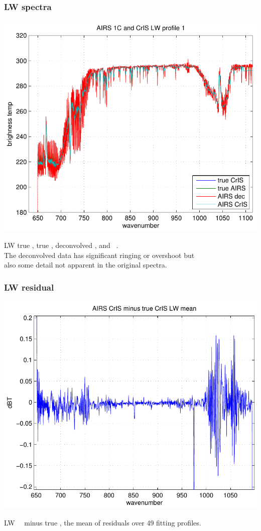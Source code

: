 \documentclass[11pt]{beamer}
\begin{document}
\begin{frame}
\frametitle{LW spectra}

\begin{center}
  \includegraphics[scale=0.54]{figures/fig_1_LW.pdf}
\end{center}

LW true \cris, true \airs, deconvolved \airs, and \airs\ \cris.  \\
The deconvolved data has significant ringing or overshoot but \\
also some detail not apparent in the original spectra.

\end{frame}
\begin{frame}
\frametitle{LW residual}

\begin{center}
  \includegraphics[scale=0.54]{figures/fig_2_LW.pdf}
\end{center}

LW \airs\ \cris\ minus true \cris, the mean of residuals over 49
fitting profiles.

\end{frame}
\end{document}

